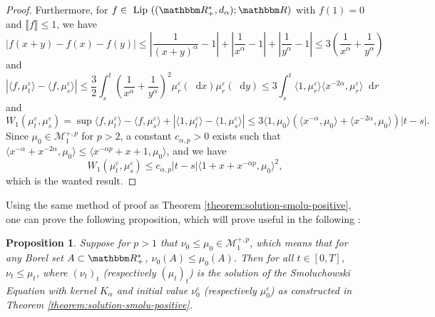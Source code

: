 \documentclass[a4paper,11pt, reqno]{amsart}
\newcommand{\cM}{\mathcal{M}}	\newcommand{\MM}{\mathbbm{M}}
\newcommand{\eps}{\varepsilon}
\newcommand{\dd}{\mathop{}\!\mathrm{d}}
\newcommand{\1}{\mathbbm{1}}
\theoremstyle{plain}
\newtheorem{proposition}[theorem]{Proposition}
\theoremstyle{definition}
\begin{document}
\begin{proof}
  Furthermore, for $f \in  \text{ Lip } ((\RR_+^{\ast}, d_{\alpha}) ;
  \RR)$ with $f (1) = 0$ and $\llbracket f \rrbracket \le 1$, we
  have
  \[ | f (x + y) - f (x) - f (y) | \le \left| \frac{1}{(x + y)^{\alpha}}
     - 1 \right| + \left| \frac{1}{x^{\alpha}} - 1 \right| + \left|
     \frac{1}{y^{\alpha}} - 1 \right| \le 3 \left( \frac{1}{x^{\alpha}}
     + \frac{1}{y^{\alpha}} \right) \]
  and
  \[ | \langle f, \mu^{\eps}_t \rangle - \langle f, \mu^{\eps}_s
     \rangle | \le \frac{3}{2} \int_s^t \left( \frac{1}{x^{\alpha}} +
     \frac{1}{y^{\alpha}} \right)^2 \mu^{\eps}_r (\dd x)
     \mu^{\eps}_r (\dd y) \le 3 \int_s^t \langle 1,
     \mu_r^{\eps} \rangle \langle x^{- 2 \alpha}, \mu_r^{\eps}
     \rangle \dd r \]
  and
  \[ W_1 (\mu^{\eps}_t, \mu^{\eps}_s) = \sup \langle f,
     \mu^{\eps}_t \rangle - \langle f, \mu^{\eps}_s \rangle + |
     \langle 1, \mu^{\eps}_t \rangle - \langle 1, \mu^{\eps}_s
     \rangle | \le 3 \langle 1, \mu_0 \rangle (\langle x^{- \alpha},
     \mu_0 \rangle + \langle x^{- 2 \alpha}, \mu_0 \rangle) | t - s | . \]
  Since $\mu_0 \in \cM_1^{+, p}$ for $p > 2$, a constant $c_{\alpha,
  p} > 0$ exists such that $\langle x^{- \alpha} + x^{- 2 \alpha}, \mu_0
  \rangle \le \langle x^{- \alpha p} + x + 1, \mu_0 \rangle$, and we
  have
  \[ W_1 (\mu^{\eps}_t, \mu^{\eps}_s) \le c_{\alpha, p} |
     t - s | \langle 1 + x + x^{- \alpha p}, \mu_0 \rangle^2, \]
  which is the wanted result.
\end{proof}

Using the same method of proof as Theorem
\ref{theorem:solution-smolu-positive}, one can prove the following
proposition, which will prove useful in the following :

\begin{proposition}
  \label{prop:positivity-smoluchowski}Suppose for $p > 1$ that $\nu_0
  \le \mu_0 \in \cM_1^{+, p}$, which means that for any Borel
  set $A \subset \RR_+^{\ast}$, $\nu_0 (A) \le \mu_0 (A)$. Then
  for all $t \in [0, T]$, $\nu_t \le \mu_t$, where $(\nu_t)_t$
  (respectively $(\mu_t)_t$) is the solution of the Smoluchowski Equation with
  kernel $K_{\alpha}$ and initial value $\nu^{\eps}_0$ (respectively
  $\mu_0^{\eps}$) as constructed in Theorem
  \ref{theorem:solution-smolu-positive}.
\end{proposition}
\end{document}
